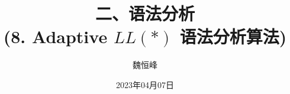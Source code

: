 \documentclass[]{beamer}
\title[语法分析]{二、语法分析 \\ (8. Adaptive $LL(\ast)$ 语法分析算法)}
\author[魏恒峰]{\large 魏恒峰}
\institute{hfwei@nju.edu.cn}
\date{2023年04月07日}
\begin{document}
\maketitle






\thankyou{}

\end{document}
